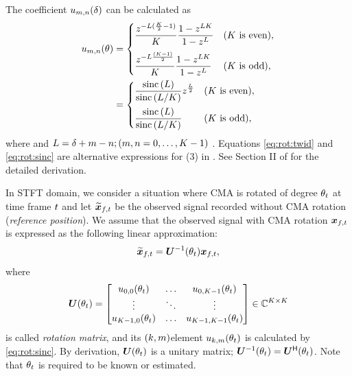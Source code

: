 \documentclass[sip,biber]{now-journal}
\begin{document}
The coefficient $u _{m,n}(\delta)$ can be calculated as
\begin{align}
  u _{m,n}(\theta)
  &=
    \begin{cases}
      \displaystyle\frac{z ^{- L (\frac{K}{2} - 1) }}{K} \frac{1 - z ^{L K}}{1 - z ^{L}} & (\text{$K$ is even}),\\[1em]
      \displaystyle\frac{z ^{- L \frac{(K - 1)}{2}}}{K} \frac{1 - z ^{L K}}{1 - z ^{L}} & (\text{$K$ is odd}),
    \end{cases}\label{eq:rot:twid} \\
  &=
    \begin{cases}
      \displaystyle \frac{\operatorname{sinc}{(L)}}{\operatorname{sinc}{\left(L / K\right)}} z ^{\frac{L}{2}} & (\text{$K$ is even}),\\[1em]
      \displaystyle \frac{\operatorname{sinc}{(L)}}{\operatorname{sinc}{\left(L / K\right)}} & (\text{$K$ is odd}),
    \end{cases}\label{eq:rot:sinc}
\end{align}
where and $L =\delta + m - n; (m, n = 0, \dots, K - 1)$ \cite{Wakabayashi:2023:ASLP}.
Equations \eqref{eq:rot:twid} and \eqref{eq:rot:sinc} are alternative expressions for (3) in \cite{Wakabayashi:2023:ASLP}.
See Section II of \cite{Wakabayashi:2023:ASLP} for the detailed derivation.

In STFT domain, we consider a situation where CMA is rotated of degree $\theta _{t}$ at time frame $t$ and let $\refpos{\Obs} _{\ft}$ be the observed signal recorded without CMA rotation (\emph{reference position}).
We assume that the observed signal with CMA rotation $\Obs _{\ft}$ is expressed as the following linear approximation:
\begin{equation}
  \refpos{\Obs} _{\ft} = \rotMat ^{-1} (\rotSpat _{\tframe}) \Obs _{\ft},
\end{equation}
where
\begin{equation}
  \rotMat (\rotSpat _{\tframe}) =
  \begin{bmatrix}
    \rotmat _{0, 0}(\rotSpat _{\tframe}) & \dots & \rotmat _{0, \Mic - 1}(\rotSpat _{\tframe}) \\
    \vdots & \ddots & \vdots \\
    \rotmat _{\Mic - 1, 0}(\rotSpat _{\tframe}) & \dots & \rotmat _{\Mic - 1, \Mic - 1}(\rotSpat _{\tframe})
  \end{bmatrix}
  \in \C ^{\Mic\times\Mic}%
  \label{eq:rotmat}
\end{equation}
is called \emph{rotation matrix}, and its $(k,m)$element $u _{k,m} (\theta _{t})$ is calculated by \eqref{eq:rot:sinc}.
By derivation, $\bm{U} (\theta _{t})$ is a unitary matrix; $\bm{U} ^{-1} (\theta _{t}) = \bm{U} ^{\mathsf{H}} (\theta _{t})$.
Note that $\theta _{t}$ is required to be known or estimated.
\end{document}
